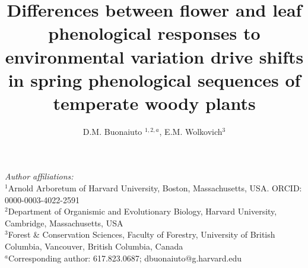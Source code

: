 \documentclass[12pt]{article}\usepackage[]{graphicx}\usepackage[]{color}
\title{Differences between flower and leaf phenological responses to environmental variation drive shifts in spring phenological sequences of temperate woody plants}
\date{}
\author{D.M. Buonaiuto $^{1,2,a}$, E.M. Wolkovich$^{3}$}
\begin{document}
\maketitle
\noindent \emph{Author affiliations:}\\
\noindent $^1$Arnold Arboretum of Harvard University, Boston, Massachusetts, USA. ORCID: 0000-0003-4022-2591\\
$^2$Department of Organismic and Evolutionary Biology, Harvard University, Cambridge, Massachusetts, USA \\
$^3$Forest \& Conservation Sciences, Faculty of Forestry, University of British Columbia, Vancouver, British Columbia, Canada\\
$^a$Corresponding author: 617.823.0687; dbuonaiuto@g.harvard.edu\\
\pagebreak


\maketitle
\linenumbers
\end{document}
